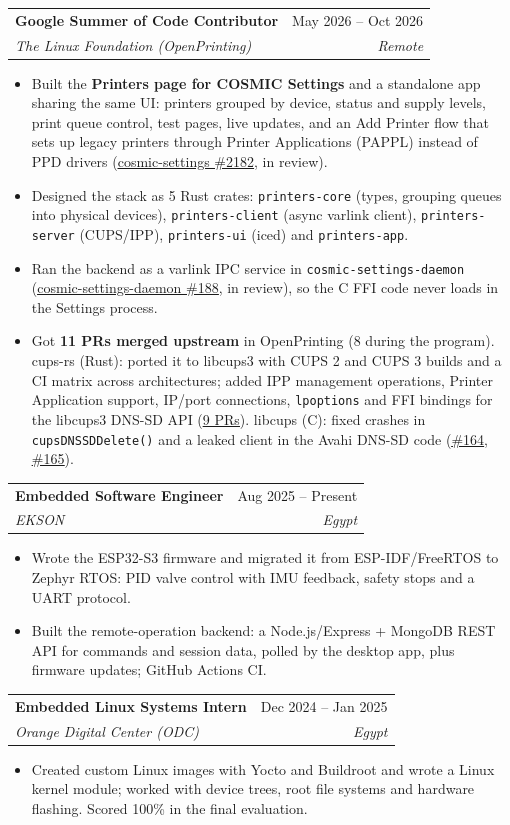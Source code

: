 \documentclass[letterpaper,11pt]{article}
\makeatletter
\newcommand{\resumeItem}[1]{
  \item\small{
    {#1 \vspace{-2pt}}
  }
}
\newcommand{\resumeSubheading}[4]{
  \vspace{-2pt}\item
    \begin{tabular*}{0.97\textwidth}[t]{l@{\extracolsep{\fill}}r}
      \textbf{#1} & #2 \\
      \textit{\small#3} & \textit{\small #4} \\
    \end{tabular*}\vspace{-7pt}
}
\newcommand{\resumeItemListStart}{\begin{itemize}}
\newcommand{\resumeItemListEnd}{\end{itemize}\vspace{-5pt}}
\newcommand{\cvlink}[2]{\href{#1}{\underline{#2}}}
\makeatother
\begin{document}
    \resumeSubheading
      {Google Summer of Code Contributor}{May 2026 -- Oct 2026}
      {The Linux Foundation (OpenPrinting)}{Remote}
      \resumeItemListStart
        \resumeItem{Built the \textbf{Printers page for COSMIC Settings} and a standalone app sharing the same UI: printers grouped by device, status and supply levels, print queue control, test pages, live updates, and an Add Printer flow that sets up legacy printers through Printer Applications (PAPPL) instead of PPD drivers (\cvlink{https://github.com/pop-os/cosmic-settings/pull/2182}{cosmic-settings \#2182}, in review).}
        \resumeItem{Designed the stack as 5 Rust crates: \texttt{printers-core} (types, grouping queues into physical devices), \texttt{printers-client} (async varlink client), \texttt{printers-server} (CUPS/IPP), \texttt{printers-ui} (iced) and \texttt{printers-app}.}
        \resumeItem{Ran the backend as a varlink IPC service in \texttt{cosmic-settings-daemon} (\cvlink{https://github.com/pop-os/cosmic-settings-daemon/pull/188}{cosmic-settings-daemon \#188}, in review), so the C FFI code never loads in the Settings process.}
        \resumeItem{Got \textbf{11 PRs merged upstream} in OpenPrinting (8 during the program). cups-rs (Rust): ported it to libcups3 with CUPS 2 and CUPS 3 builds and a CI matrix across architectures; added IPP management operations, Printer Application support, IP/port connections, \texttt{lpoptions} and FFI bindings for the libcups3 DNS-SD API (\cvlink{https://github.com/OpenPrinting/cups-rs/pulls?q=is:pr+author:Abd002+is:merged}{9 PRs}). libcups (C): fixed crashes in \texttt{cupsDNSSDDelete()} and a leaked client in the Avahi DNS-SD code (\cvlink{https://github.com/OpenPrinting/libcups/pull/164}{\#164}, \cvlink{https://github.com/OpenPrinting/libcups/pull/165}{\#165}).}
      \resumeItemListEnd

    \resumeSubheading
      {Embedded Software Engineer}{Aug 2025 -- Present}
      {EKSON}{Egypt}
      \resumeItemListStart
        \resumeItem{Wrote the ESP32-S3 firmware and migrated it from ESP-IDF/FreeRTOS to Zephyr RTOS: PID valve control with IMU feedback, safety stops and a UART protocol.}
        \resumeItem{Built the remote-operation backend: a Node.js/Express + MongoDB REST API for commands and session data, polled by the desktop app, plus firmware updates; GitHub Actions CI.}
      \resumeItemListEnd

    \resumeSubheading
      {Embedded Linux Systems Intern}{Dec 2024 -- Jan 2025}
      {Orange Digital Center (ODC)}{Egypt}
      \resumeItemListStart
        \resumeItem{Created custom Linux images with Yocto and Buildroot and wrote a Linux kernel module; worked with device trees, root file systems and hardware flashing. Scored 100\% in the final evaluation.}
      \resumeItemListEnd
\end{document}

